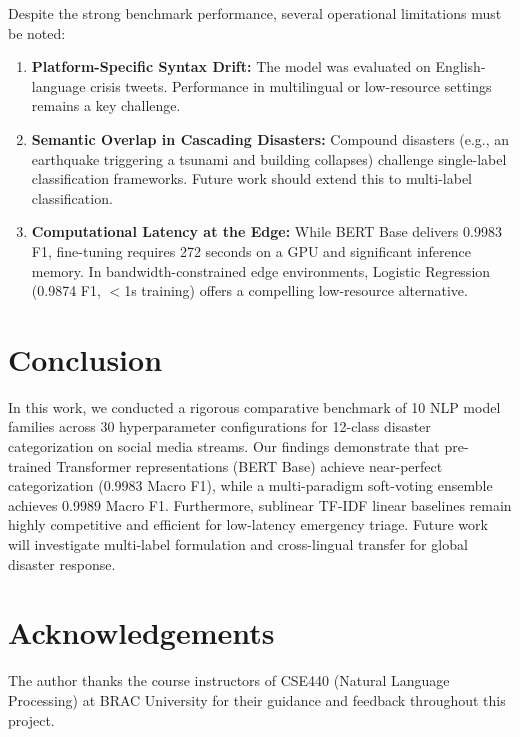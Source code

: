 \documentclass[11pt,a4paper]{article}
\begin{document}
Despite the strong benchmark performance, several operational limitations must be noted:
\begin{enumerate}
    \item \textbf{Platform-Specific Syntax Drift:} The model was evaluated on English-language crisis tweets. Performance in multilingual or low-resource settings remains a key challenge.
    \item \textbf{Semantic Overlap in Cascading Disasters:} Compound disasters (e.g., an earthquake triggering a tsunami and building collapses) challenge single-label classification frameworks. Future work should extend this to multi-label classification.
    \item \textbf{Computational Latency at the Edge:} While BERT Base delivers 0.9983 F1, fine-tuning requires 272 seconds on a GPU and significant inference memory. In bandwidth-constrained edge environments, Logistic Regression (0.9874 F1, $<$1s training) offers a compelling low-resource alternative.
\end{enumerate}

\section{Conclusion}
\label{sec:conclusion}

In this work, we conducted a rigorous comparative benchmark of 10 NLP model families across 30 hyperparameter configurations for 12-class disaster categorization on social media streams. Our findings demonstrate that pre-trained Transformer representations (BERT Base) achieve near-perfect categorization (0.9983 Macro F1), while a multi-paradigm soft-voting ensemble achieves 0.9989 Macro F1. Furthermore, sublinear TF-IDF linear baselines remain highly competitive and efficient for low-latency emergency triage. Future work will investigate multi-label formulation and cross-lingual transfer for global disaster response.

\section*{Acknowledgements}
The author thanks the course instructors of CSE440 (Natural Language Processing) at BRAC University for their guidance and feedback throughout this project.



\end{document}
